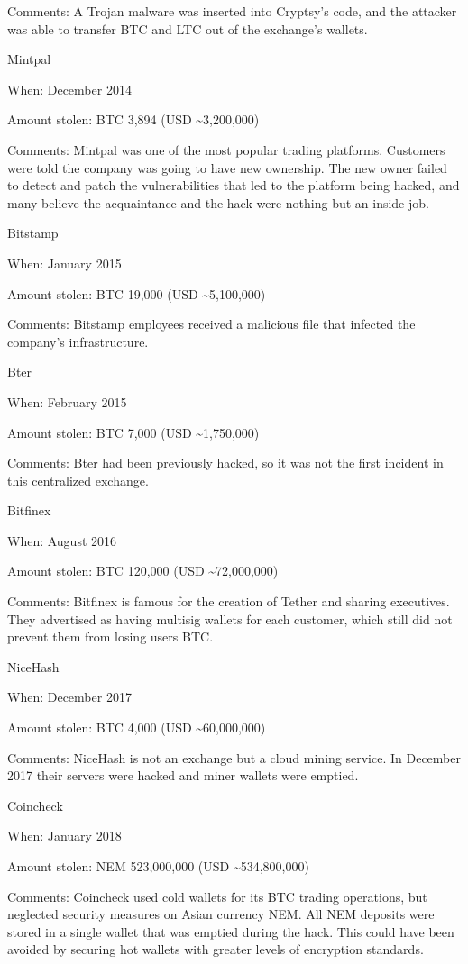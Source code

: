 \documentclass[11pt]{article}
\begin{document}
Comments: A Trojan malware was inserted into Cryptsy's code, and the attacker was able to transfer BTC and LTC out of the exchange's wallets.


Mintpal


When: December 2014


Amount stolen: BTC 3,894 (USD \textasciitilde{}3,200,000)


Comments: Mintpal was one of the most popular trading platforms. Customers were told the company was going to have new ownership. The new owner failed to detect and patch the vulnerabilities that led to the platform being hacked, and many believe the acquaintance and the hack were nothing but an inside job.


Bitstamp


When: January 2015


Amount stolen: BTC 19,000 (USD \textasciitilde{}5,100,000)


Comments: Bitstamp employees received a malicious file that infected the company's infrastructure.


Bter


When: February 2015


Amount stolen: BTC 7,000 (USD \textasciitilde{}1,750,000)


Comments: Bter had been previously hacked, so it was not the first incident in this centralized exchange.


Bitfinex


When: August 2016


Amount stolen: BTC 120,000 (USD \textasciitilde{}72,000,000)


Comments: Bitfinex is famous for the creation of Tether and sharing executives. They advertised as having multisig wallets for each customer, which still did not prevent them from losing users BTC.


NiceHash


When: December 2017


Amount stolen: BTC 4,000 (USD \textasciitilde{}60,000,000)


Comments: NiceHash is not an exchange but a cloud mining service. In December 2017 their servers were hacked and miner wallets were emptied.


Coincheck


When: January 2018


Amount stolen: NEM 523,000,000 (USD \textasciitilde{}534,800,000)


Comments: Coincheck used cold wallets for its BTC trading operations, but neglected security measures on Asian currency NEM. All NEM deposits were stored in a single wallet that was emptied during the hack. This could have been avoided by securing hot wallets with greater levels of encryption standards.
\end{document}
